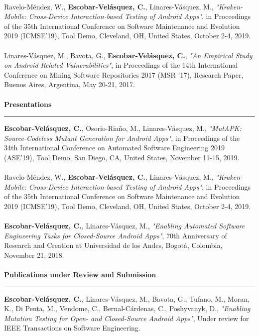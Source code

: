 \documentclass[letterpaper,11pt,oneside]{article}
\begin{document}
\\
\noindent [c2] Ravelo-Méndez, W., \textbf{Escobar-Velásquez, C.}, Linares-Vásquez, M., \textit{"Kraken-Mobile: Cross-Device Interaction-based Testing of Android Apps"}, in Proceedings of the 35th International Conference on Software Maintenance and Evolution 2019 (ICMSE’19), Tool Demo, Cleveland, OH, United States, October 2-4, 2019. \\
\\
\noindent [c1] Linares-Vásquez, M., Bavota, G., \textbf{Escobar-Velásquez, C.}, \textit{"An Empirical Study on Android-Related Vulnerabilities"}, in Proceedings of the 14th International Conference on Mining Software Repositories 2017 (MSR ’17), Research Paper, Buenos Aires, Argentina, May 20-21, 2017. \\
\\
\noindent \Large{\textbf{Presentations}} \\
\vspace{-2ex}
\hrule 
\normalsize
\vspace{2ex}
\noindent [p3] \textbf{Escobar-Velásquez, C.}, Osorio-Riaño, M., Linares-Vásquez, M., \textit{"MutAPK: Source-Codeless Mutant Generation for Android Apps"}, in Proceedings of the 34th International Conference on Automated Software Engineering 2019 (ASE’19), Tool Demo, San Diego, CA, United States, November 11-15, 2019. \\
\\
\noindent [p2] Ravelo-Méndez, W., \textbf{Escobar-Velásquez, C.}, Linares-Vásquez, M., \textit{"Kraken-Mobile: Cross-Device Interaction-based Testing of Android Apps"}, in Proceedings of the 35th International Conference on Software Maintenance and Evolution 2019 (ICMSE’19), Tool Demo, Cleveland, OH, United States, October 2-4, 2019. \\
\\
\noindent [p1] \textbf{Escobar-Velásquez, C.}, Linares-Vásquez, M., \textit{"Enabling Automated Software Engineering Tasks for Closed-Source Android Apps"}, 70th Anniversary of Research and Creation at Universidad de los Andes, Bogotá, Colombia, November 21, 2018. \\
\\

\noindent \Large{\textbf{Publications under Review and Submission}} \\
\vspace{-2ex}
\hrule 
\normalsize
\vspace{2ex}
\noindent \textbf{Escobar-Velásquez, C.}, Linares-Vásquez, M., Bavota, G., Tufano, M., Moran, K., Di Penta, M., Vendome, C., Bernal-Cárdenas, C., Poshyvanyk, D., \textit{"Enabling Mutation Testing for Open- and Closed-Source Android Apps"}, Under review for IEEE Transactions on Software Engineering.
\\
\end{document}
